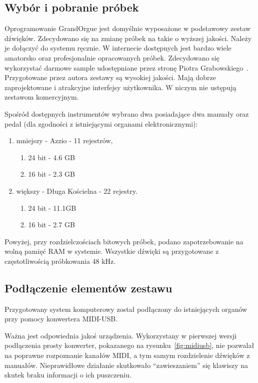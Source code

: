 \documentclass[11pt]{report}
\begin{document}
    \subsection{Wybór i pobranie próbek}
    Oprogramowanie GrandOrgue jest domyślnie wyposażone w podstawowy zestaw dźwięków.
    Zdecydowano się na zmianę próbek na takie o wyższej jakości.
    Należy je dołączyć do systemu ręcznie.
    W internecie dostępnych jest bardzo wiele amatorsko oraz profesjonalnie opracowanych próbek.
    Zdecydowano się wykorzystać darmowe sample udostępniane przez stronę Piotra Grabowskiego~\cite{grabowski}.
    Przygotowane przez autora zestawy są wysokiej jakości.
    Mają dobrze zaprojektowane i atrakcyjne interfejsy użytkownika.
    W niczym nie ustępują zestawom komercyjnym.

    Spośród dostępnych instrumentów wybrano dwa posiadające dwa manuały oraz pedał (dla zgodności z istniejącymi organami elektronicznymi):
    \begin{enumerate}
        \item mniejszy - Azzio - 11 rejestrów,
        \begin{enumerate}
            \item 24 bit - 4.6 GB
            \item 16 bit - 2.3 GB
        \end{enumerate}
        \item większy - Długa Kościelna - 22 rejestry.
        \begin{enumerate}
            \item 24 bit - 11.1GB
            \item 16 bit - 2.7 GB
        \end{enumerate}
    \end{enumerate}
    Powyżej, przy rozdzielczościach bitowych próbek, podano zapotrzebowanie na wolną pamięć RAM w systemie.
    Wszystkie dźwięki są przygotowane z częstotliwością próbkowania 48 kHz.

    \subsection{Podłączenie elementów zestawu}
    Przygotowany system komputerowy został podłączony do istniejących organów przy pomocy konwertera MIDI-USB.

    Ważna jest odpowiednia jakoś urządzenia.
    Wykorzystany w pierwszej wersji podłączenia prosty konwerter, pokazanego na rysunku~\ref{fig:midiusb}, nie pozwalał na poprawne rozpoznanie kanałów MIDI, a tym samym rozdzielenie dźwięków z manuałów.
    Nieprawidłowe działanie skutkowało ``zawieszaniem'' się klawiszy na skutek braku informacji o ich puszczeniu.
\end{document}
